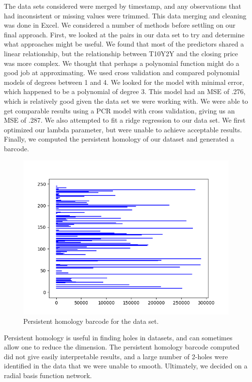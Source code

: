 \documentclass[12pt]{article}
\begin{document}
    The data sets considered were merged by timestamp, and any observations that had inconsistent or missing values were trimmed. This data merging and cleaning was done in Excel. We considered a number of methods before settling on our final approach. First, we looked at the pairs in our data set to try and determine what approaches might be useful. We found that most of the predictors shared a linear relationship, but the relationship between T10Y2Y and the closing price was more complex. We thought that perhaps a polynomial function might do a good job at approximating. We used cross validation and compared polynomial models of degrees between 1 and 4. We looked for the model with minimal error, which happened to be a polynomial of degree 3. This model had an MSE of .276, which is relatively good given the data set we were working with. We were able to get comparable results using a PCR model with cross validation, giving us an MSE of .287. We also attempted to fit a ridge regression to our data set. We first optimized our lambda parameter, but were unable to achieve acceptable results. Finally, we computed the persistent homology of our dataset and generated a barcode. 
    
\begin{figure}[H]
\centering
\includegraphics[scale=.75]{images/SPY-barcode.png}
\caption{Persistent homology barcode for the data set.}
\end{figure}
    
Persistent homology is useful in finding holes in datasets, and can sometimes allow one to reduce the dimension. The persistent homology barcode computed did not give easily interpretable results, and a large number of 2-holes were identified in the data that we were unable to smooth. Ultimately, we decided on a radial basis function network.
    
\end{document}
